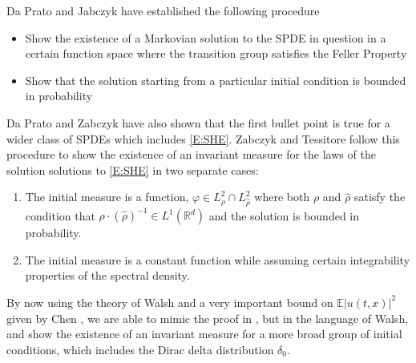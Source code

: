 \documentclass[a4paper,11pt]{article}
\numberwithin{equation}{section}
\theoremstyle{plain}
\theoremstyle{definition}
\newcommand{\R}{\mathbb{R}}
\numberwithin{NQ}{section}
\numberwithin{LQ}{section}
\numberwithin{ZQ}{section}
\begin{document}
Da Prato and Jabczyk have \cite{DZ96} established the following procedure
	\begin{itemize}
		\item Show the existence of a Markovian solution to the SPDE in question in a certain function space where the
	transition group satisfies the Feller Property
		\item Show that the solution starting from a particular initial condition is bounded in probability
	\end{itemize}
Da Prato and Zabczyk \cite{DZp92} have also shown that the first bullet point is true for a wider class of SPDEs which includes \eqref{E:SHE}. Zabczyk and Tessitore \cite{TessitoreZabczyk98M} follow this procedure to show the existence of an invariant measure for the laws of the solution solutions to \eqref{E:SHE} in two separate cases:
\begin{enumerate}
	\item The initial measure is a function, $\varphi \in L^2_\rho \cap L^2_{\hat\rho}$ where both $\rho$ and
	$\hat\rho$ satisfy the condition that $\rho \cdot (\hat\rho)^{-1} \in L^1(\R^d)$ and the solution is
	bounded in probability.
	\item The initial measure is a constant function while assuming certain integrability properties of the spectral
	density.
\end{enumerate}
By now using the theory of Walsh and a very important bound on $\mathbb{E}{|u(t,x)|^2}$ given by Chen \cite{CH16Comparison}, we are able to mimic the proof in \cite{TessitoreZabczyk98M}, but in the language of Walsh, and show the existence of an invariant measure for a more broad group of initial conditions, which includes the Dirac delta distribution $\delta_0$. 
\end{document}
